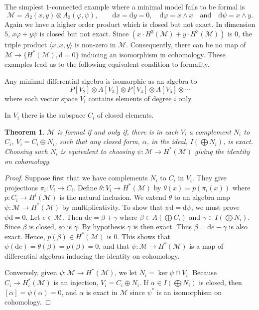 \documentclass[11pt]{amsart}
\theoremstyle{plain}
\newtheorem{theorem}{Theorem}[section]
\theoremstyle{definition}
\newcommand{\cM}{\mathcal{M}}
\newcommand{\dd}{\mathrm{d}}
\begin{document}
The simplest $1$-connected example where a minimal model fails to be formal is
\[
\cM = A_{2}(x,y) \otimes A_{3}(\varphi, \psi), \qquad \dd x = \dd y = 0, \quad \dd\varphi = x \wedge x \quad \text{and} \quad \dd\psi = x \wedge y.
\]
Again we have a higher order product which is closed but not exact. In dimension $5$, $x\varphi + y\psi$ is closed but not exact. Since $(x \cdot H^{3}(\cM) + y \cdot H^{3}(\cM))$ is $0$, the triple product $\langle x, x, y \rangle$ is non-zero in $\cM$. Consequently, there can be no map of $\cM \to \{H^{*}(\cM), \dd = 0\}$ inducing an isomorphism in cohomology. These examples lead us to the following equivalent condition to formality.

Any minimal differential algebra is isomorphic as an algebra to
\[
P[V_{2}] \otimes A[V_{3}] \otimes P[V_{4}] \otimes A[V_{5}] \otimes \cdots
\]
where each vector space $V_{i}$ contains elements of degree $i$ only.

In $V_{i}$ there is the subspace $C_{i}$ of closed elements.

\begin{theorem}\label{thm:4.1}
$\cM$ is formal if and only if, there is in each $V_{i}$ a complement $N_{i}$ to $C_{i}$, $V_{i} = C_{i} \oplus N_{i}$, such that any closed form, $\alpha$, in the ideal, $I(\bigoplus N_{i})$, is exact. Choosing such $N_{i}$ is equivalent to choosing $\psi \colon \cM \to H^{*}(\cM)$ giving the identity on cohomology.
\end{theorem}

\begin{proof}
Suppose first that we have complements $N_{i}$ to $C_{i}$ in $V_{i}$. They give projections $\pi_{i} \colon V_{i} \to C_{i}$. Define $\theta \colon V_{i} \to H^{*}(\cM)$ by $\theta(x) = p(\pi_{i}(x))$ where $p \colon C_{i} \to H^{i}(\cM)$ is the natural inclusion. We extend $\theta$ to an algebra map $\psi \colon \cM \to H^{*}(\cM)$ by multiplicativity. To show that $\psi\dd = \dd\psi$, we must prove $\psi\dd = 0$. Let $e \in \cM$. Then $\dd e = \beta + \gamma$ where $\beta \in A(\bigoplus C_{i})$ and $\gamma \in I(\bigoplus N_{i})$. Since $\beta$ is closed, so is $\gamma$. By hypothesis $\gamma$ is then exact. Thus $\beta = \dd e - \gamma$ is also exact. Hence, $p(\beta) \in H^{*}(\cM)$ is $0$. This shows that $\psi(\dd e) = \theta(\beta) = p(\beta) = 0$, and that $\psi \colon \cM \to H^{*}(\cM)$ is a map of differential algebras inducing the identity on cohomology.

Conversely, given $\psi \colon \cM \to H^{*}(\cM)$, we let $N_{i} = \ker\psi \cap V_{i}$. Because $C_{i} \to H^{*}_{i}(\cM)$ is an injection, $V_{i} = C_{i} \oplus N_{i}$. If $\alpha \in I(\bigoplus N_{i})$ is closed, then $[\alpha] = \psi(\alpha) = 0$, and $\alpha$ is exact in $\cM$ since $\psi^{*}$ is an isomorphism on cohomology.
\end{proof}
\end{document}
